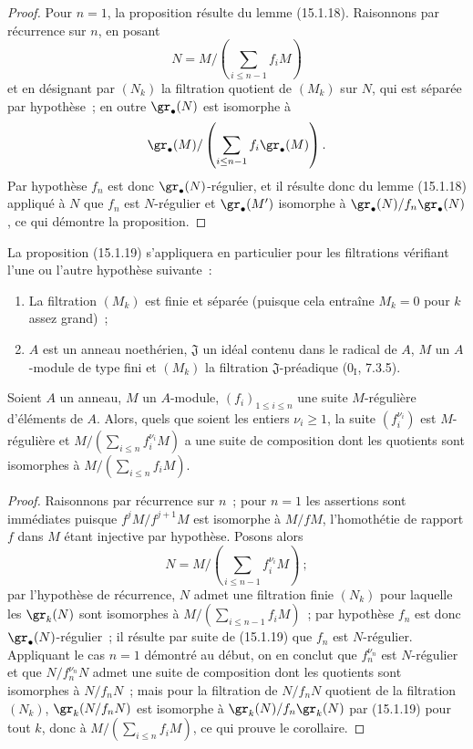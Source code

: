 \begin{proof}
Pour $n=1$, la proposition résulte du lemme (15.1.18). Raisonnons par
récurrence sur $n$, en posant
\[
  N=M/\left(\sum_{i\leq n-1}f_iM\right)
\]
et en désignant par $(N_k)$ la filtration quotient de $(M_k)$ sur $N$, qui
est séparée par hypothèse~; en outre $\gr_\bullet(N)$ est isomorphe à
\[
  \gr_\bullet(M)/
  \left(\sum_{i\leq n-1}f_i\gr_\bullet(M)\right).
\]
Par hypothèse $f_n$ est donc $\gr_\bullet(N)$-régulier, et il résulte donc du
lemme (15.1.18) appliqué à $N$ que $f_n$ est $N$-régulier et
$\gr_\bullet(M')$ isomorphe à
$\gr_\bullet(N)/f_n\gr_\bullet(N)$, ce qui démontre la proposition.
\end{proof}

La proposition (15.1.19) s'appliquera en particulier pour les filtrations
vérifiant l'une ou l'autre hypothèse suivante~:
\begin{enumerate}
  \item[$1^\circ$] La filtration $(M_k)$ est finie et séparée (puisque cela
  entraîne $M_k=0$ pour $k$ assez grand)~;
  \item[$2^\circ$] $A$ est un anneau noethérien, $\mathfrak{J}$ un idéal
  contenu dans le radical de $A$, $M$ un $A$-module de type fini et $(M_k)$
  la filtration $\mathfrak{J}$-préadique ($0_{\mathrm I}$, 7.3.5).
\end{enumerate}

\begin{corollary}[15.1.20]
\label{0.15.1.20-fr}
Soient $A$ un anneau, $M$ un $A$-module, $(f_i)_{1\leq i\leq n}$ une suite
$M$-régulière d'éléments de $A$. Alors, quels que soient les entiers
$\nu_i\geq1$, la suite $(f_i^{\nu_i})$ est $M$-régulière et
$M/(\sum_{i\leq n}f_i^{\nu_i}M)$ a une suite de composition dont les
quotients sont isomorphes à $M/(\sum_{i\leq n}f_iM)$.
\end{corollary}

\begin{proof}
Raisonnons par récurrence sur $n$~; pour $n=1$ les assertions sont immédiates
puisque $f^jM/f^{j+1}M$ est isomorphe à $M/fM$, l'homothétie de rapport $f$
dans $M$ étant injective par hypothèse. Posons alors
\[
  N=M/\left(\sum_{i\leq n-1}f_i^{\nu_i}M\right)~;
\]
par l'hypothèse de récurrence, $N$ admet une filtration finie $(N_k)$ pour
laquelle les $\gr_k(N)$ sont isomorphes à
$M/(\sum_{i\leq n-1}f_iM)$~; par hypothèse $f_n$ est donc
$\gr_\bullet(N)$-régulier~; il résulte par suite de (15.1.19) que $f_n$ est
$N$-régulier. Appliquant le cas $n=1$ démontré au début, on en conclut que
$f_n^{\nu_n}$ est $N$-régulier et que $N/f_n^{\nu_n}N$ admet une suite de
composition dont les quotients sont isomorphes à $N/f_nN$~; mais pour la
filtration de $N/f_nN$ quotient de la filtration $(N_k)$,
$\gr_k(N/f_nN)$ est isomorphe à $\gr_k(N)/f_n\gr_k(N)$ par (15.1.19) pour
tout $k$, donc à $M/(\sum_{i\leq n}f_iM)$, ce qui prouve le corollaire.
\end{proof}

